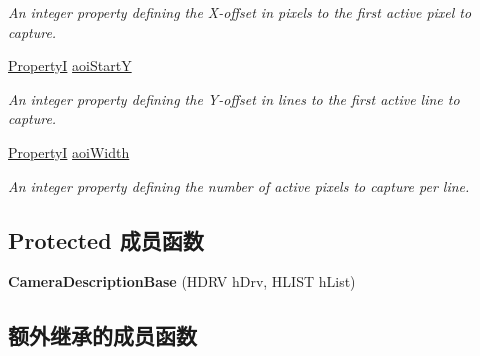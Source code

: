 \begin{DoxyCompactItemize}
\begin{DoxyCompactList}\small\item\em An integer property defining the X-\/offset in pixels to the first active pixel to capture. \end{DoxyCompactList}\item 
\hypertarget{classmv_i_m_p_a_c_t_1_1acquire_1_1_camera_description_base_a92905ad4932a8a8b06d5b18597349513}{\hyperlink{group___common_interface_ga12d5e434238ca242a1ba4c6c3ea45780}{Property\+I} \hyperlink{classmv_i_m_p_a_c_t_1_1acquire_1_1_camera_description_base_a92905ad4932a8a8b06d5b18597349513}{aoi\+Start\+Y}}\label{classmv_i_m_p_a_c_t_1_1acquire_1_1_camera_description_base_a92905ad4932a8a8b06d5b18597349513}

\begin{DoxyCompactList}\small\item\em An integer property defining the Y-\/offset in lines to the first active line to capture. \end{DoxyCompactList}\item 
\hypertarget{classmv_i_m_p_a_c_t_1_1acquire_1_1_camera_description_base_a0a121e69df859f7384e48d52875aabd7}{\hyperlink{group___common_interface_ga12d5e434238ca242a1ba4c6c3ea45780}{Property\+I} \hyperlink{classmv_i_m_p_a_c_t_1_1acquire_1_1_camera_description_base_a0a121e69df859f7384e48d52875aabd7}{aoi\+Width}}\label{classmv_i_m_p_a_c_t_1_1acquire_1_1_camera_description_base_a0a121e69df859f7384e48d52875aabd7}

\begin{DoxyCompactList}\small\item\em An integer property defining the number of active pixels to capture per line. \end{DoxyCompactList}\end{DoxyCompactItemize}
\subsection*{Protected 成员函数}
\begin{DoxyCompactItemize}
\item 
\hypertarget{classmv_i_m_p_a_c_t_1_1acquire_1_1_camera_description_base_a8885c8249fe94a4145bdc076165de433}{{\bfseries Camera\+Description\+Base} (H\+D\+R\+V h\+Drv, H\+L\+I\+S\+T h\+List)}\label{classmv_i_m_p_a_c_t_1_1acquire_1_1_camera_description_base_a8885c8249fe94a4145bdc076165de433}

\end{DoxyCompactItemize}
\subsection*{额外继承的成员函数}


